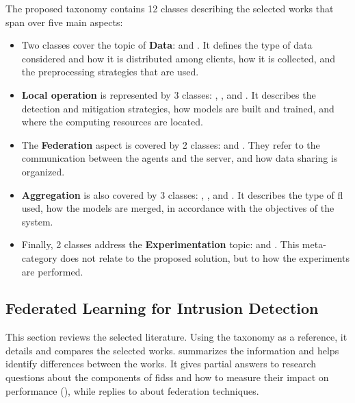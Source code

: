 The proposed taxonomy contains 12 classes describing the selected works that span over five main aspects:
\begin{itemize}
  \item Two classes cover the topic of \textbf{Data}: \emph{} and \emph{}.
  It defines the type of data considered and how it is distributed among clients, how it is collected, and the preprocessing strategies that are used.
  
  \item \textbf{Local operation} is represented by 3 classes: \emph{}, \emph{}, and \emph{}.
  It describes the detection and mitigation strategies, how models are built and trained, and where the computing resources are located.
  
  \item The \textbf{Federation} aspect is covered by 2 classes: \emph{} and \emph{}.
  They refer to the communication between the agents and the server, and how data sharing is organized.
  
  \item \textbf{Aggregation} is also covered by 3 classes: \emph{}, \emph{}, and \emph{}.
  It describes the type of \gls{fl} used, how the models are merged, in accordance with the objectives of the system.
  
  \item Finally, 2 classes address the \textbf{Experimentation} topic: \emph{} and \emph{}.
  This meta-category does not relate to the proposed solution, but to how the experiments are performed.
\end{itemize}



\subsection{Federated Learning for Intrusion Detection\label{sec:sota.quali.fids}}

This section reviews the selected literature.
Using the taxonomy as a reference, it details and compares the selected works.
 summarizes the information and helps identify differences between the works.
It gives partial answers to research questions about the components of \glspl{fids} and how to measure their impact on performance (), while  replies to  about federation techniques.


